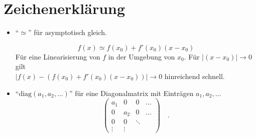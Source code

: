 \clearpage
\section*{Zeichenerklärung}

\begin{itemize}
 \item "`$\simeq$"' für asymptotisch gleich.
	\begin{beispiel}
	 \begin{equation}
	  f(x)\simeq f(x_0)+f'(x_0)(x-x_0)
	 \end{equation}
	  Für eine Linearisierung von $f$ in der Umgebung von $x_0$. Für 
	  $
	  \left|(x-x_0)\right|\rightarrow 0
	  $
	  gilt \\ 
	  $
	  \left|f(x)-\left(f(x_0)+f'(x_0)(x-x_0)\right)\right|\rightarrow 0 
	  $
	  hinreichend schnell.
	\end{beispiel}
	
	
	
	
  \item "`$\text{diag}(a_1,a_2,\ldots)$"' für eine Diagonalmatrix mit Einträgen $a_1,a_2,\ldots$
	\begin{equation}
	 \begin{pmatrix}
	  a_1 & 0   &  0& \dots \\
	  0   & a_2 & 0 & \dots \\
	  0   &  0  &\ddots & \\
	  \vdots & \vdots
	 \end{pmatrix} \quad .
	\end{equation}


      
 
 
\end{itemize}
